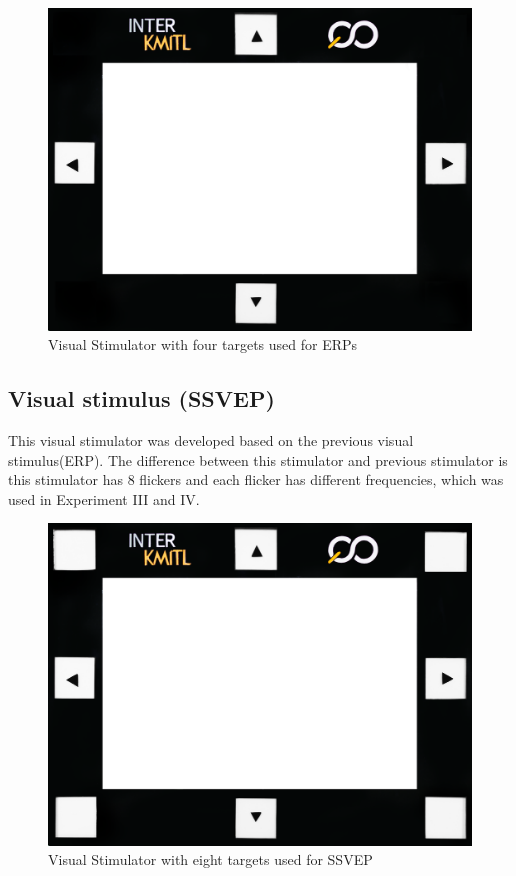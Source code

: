 \begin{figure}[ht]
	\centering
	\includegraphics[scale=0.25]{chapter7/frame_4.jpg}
	\caption{Visual Stimulator with four targets used for ERPs}
	\label{fig:vs}
\end{figure}

\newpage
\subsection{Visual stimulus (SSVEP)}
\hspace{1.5cm} This visual stimulator was developed based on the previous visual stimulus(ERP). The difference between this stimulator and previous stimulator is this stimulator has 8 flickers and each flicker has different frequencies, which was used in Experiment III and IV.

\begin{figure}[ht]
	\centering
	\includegraphics[scale=0.25]{chapter7/frame_8.jpg}
	\caption{Visual Stimulator with eight targets used for SSVEP}
\end{figure}

